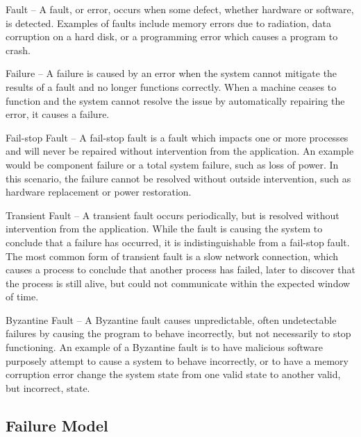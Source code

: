 \begin{description}

\item{Fault} -- A fault, or error, occurs when some defect, whether hardware or 
software, is detected. Examples of faults include memory errors due to radiation, data corruption on a hard disk, or a programming error which causes a program to crash.

\item{Failure} -- A failure is caused by an error when the system cannot 
mitigate the results of a fault and no longer functions correctly. When a machine ceases to function and the system cannot resolve the issue by automatically repairing the error, it causes a failure.

\item{Fail-stop Fault} -- A fail-stop fault is a fault which impacts one or more 
processes and will never be repaired without intervention from the application. 
An example would be component failure or a total system failure, such as loss of 
power. In this scenario, the failure cannot be resolved without outside 
intervention, such as hardware replacement or power restoration.

\item{Transient Fault} -- A transient fault occurs periodically, but is resolved 
without intervention from the application. While the fault is causing the system 
to conclude that a failure has occurred, it is indistinguishable from a fail-stop 
fault. The most common form of transient fault is a slow network connection, which 
causes a process to conclude that another process has failed, later to discover that 
the process is still alive, but could not communicate within the expected window of 
time.

\item{Byzantine Fault} -- A Byzantine fault causes unpredictable, often 
undetectable failures by causing the program to behave incorrectly, but not 
necessarily to stop functioning. An example of a Byzantine fault is to have malicious 
software purposely attempt to cause a system to behave incorrectly, or to have a memory 
corruption error change the system state from one valid state to another valid, but 
incorrect, state.

\end{description}

\subsection{Failure Model}
\label{subsec:background:terminology:model}

